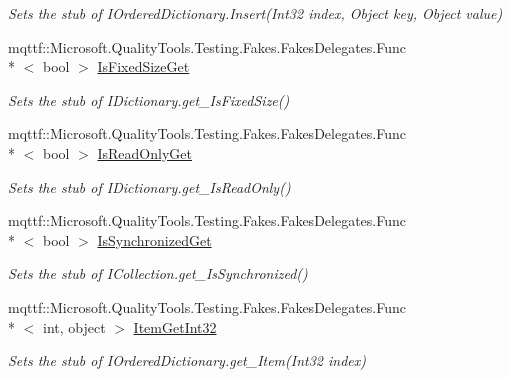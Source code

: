 \begin{DoxyCompactItemize}
\begin{DoxyCompactList}\small\item\em Sets the stub of I\-Ordered\-Dictionary.\-Insert(\-Int32 index, Object key, Object value)\end{DoxyCompactList}\item 
mqttf\-::\-Microsoft.\-Quality\-Tools.\-Testing.\-Fakes.\-Fakes\-Delegates.\-Func\\*
$<$ bool $>$ \hyperlink{class_system_1_1_collections_1_1_specialized_1_1_fakes_1_1_stub_i_ordered_dictionary_a32d55c0a58d43dc0085b50fd16ea68b6}{Is\-Fixed\-Size\-Get}
\begin{DoxyCompactList}\small\item\em Sets the stub of I\-Dictionary.\-get\-\_\-\-Is\-Fixed\-Size()\end{DoxyCompactList}\item 
mqttf\-::\-Microsoft.\-Quality\-Tools.\-Testing.\-Fakes.\-Fakes\-Delegates.\-Func\\*
$<$ bool $>$ \hyperlink{class_system_1_1_collections_1_1_specialized_1_1_fakes_1_1_stub_i_ordered_dictionary_a765c69cec24408e0b940af41e18d6081}{Is\-Read\-Only\-Get}
\begin{DoxyCompactList}\small\item\em Sets the stub of I\-Dictionary.\-get\-\_\-\-Is\-Read\-Only()\end{DoxyCompactList}\item 
mqttf\-::\-Microsoft.\-Quality\-Tools.\-Testing.\-Fakes.\-Fakes\-Delegates.\-Func\\*
$<$ bool $>$ \hyperlink{class_system_1_1_collections_1_1_specialized_1_1_fakes_1_1_stub_i_ordered_dictionary_adb19e739ede2449391cd1354a1645716}{Is\-Synchronized\-Get}
\begin{DoxyCompactList}\small\item\em Sets the stub of I\-Collection.\-get\-\_\-\-Is\-Synchronized()\end{DoxyCompactList}\item 
mqttf\-::\-Microsoft.\-Quality\-Tools.\-Testing.\-Fakes.\-Fakes\-Delegates.\-Func\\*
$<$ int, object $>$ \hyperlink{class_system_1_1_collections_1_1_specialized_1_1_fakes_1_1_stub_i_ordered_dictionary_a24616bd6430dcfdc72dc4be60439b1f7}{Item\-Get\-Int32}
\begin{DoxyCompactList}\small\item\em Sets the stub of I\-Ordered\-Dictionary.\-get\-\_\-\-Item(\-Int32 index)\end{DoxyCompactList}\item 

\end{DoxyCompactItemize}
